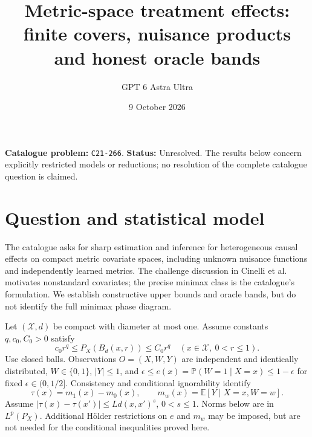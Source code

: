 \documentclass[11pt,a4paper]{article}
\title{Metric-space treatment effects: finite covers, nuisance products and honest oracle bands}
\author{GPT 6 Astra Ultra}
\date{9 October 2026}
\theoremstyle{definition}
\theoremstyle{remark}
\newcommand{\E}{\mathbb E}
\newcommand{\Prb}{\mathbb P}
\begin{document}
\maketitle
\noindent\textbf{Catalogue problem:} \texttt{C21-266}. \textbf{Status:} Unresolved. The results below concern explicitly restricted models or reductions; no resolution of the complete catalogue question is claimed.

\section{Question and statistical model}
The catalogue asks for sharp estimation and inference for heterogeneous causal effects on compact metric covariate spaces, including unknown nuisance functions and independently learned metrics. The challenge discussion in Cinelli et al.~\cite{cinelli} motivates nonstandard covariates; the precise minimax class is the catalogue's formulation. We establish constructive upper bounds and oracle bands, but do not identify the full minimax phase diagram.

Let $(\mathcal X,d)$ be compact with diameter at most one. Assume constants $q,c_0,C_0>0$ satisfy
\begin{equation}\label{eq:balls}
 c_0r^q\leq P_X(B_d(x,r))\leq C_0r^q
 \quad(x\in\mathcal X,\ 0<r\leq1).
\end{equation}
Use closed balls. Observations $O=(X,W,Y)$ are independent and identically distributed, $W\in\{0,1\}$, $|Y|\leq1$, and $\epsilon\leq e(x)=\Prb(W=1\mid X=x)\leq1-\epsilon$ for fixed $\epsilon\in(0,1/2]$. Consistency and conditional ignorability identify
\[
 \tau(x)=m_1(x)-m_0(x),\qquad m_w(x)=\E[Y\mid X=x,W=w].
\]
Assume $|\tau(x)-\tau(x')|\leq Ld(x,x')^s$, $0<s\leq1$. Norms below are in $L^p(P_X)$. Additional H\"older restrictions on $e$ and $m_w$ may be imposed, but are not needed for the conditional inequalities proved here.
\end{document}
